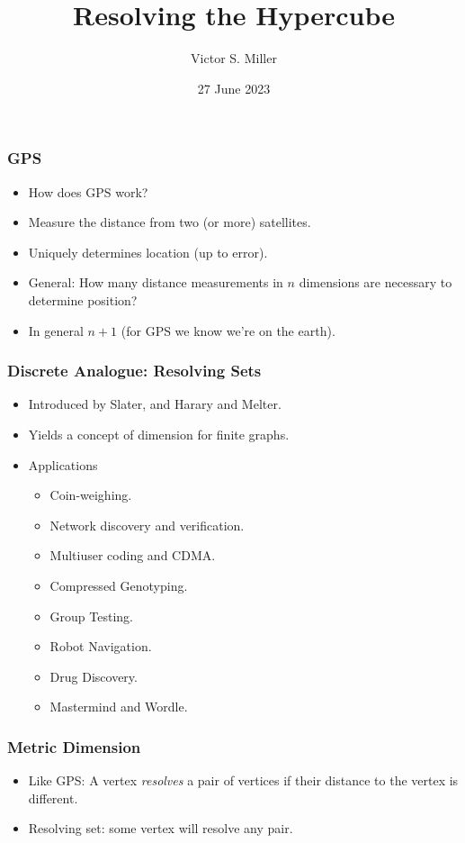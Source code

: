 \documentclass{beamer}
\title{Resolving the Hypercube}
\author{Victor S. Miller}
\institute{SRI International, Computer Science Laboratory \\
Menlo Park, CA USA}
\date{27 June 2023}
\begin{document}
\begin{frame}[plain]
  \maketitle
\end{frame}
\begin{frame}
  \frametitle{GPS}
  \begin{itemize}
  \item How does GPS work?
  \item Measure the distance from two (or more) satellites.
  \item Uniquely determines location (up to error).
  \item General: How many distance measurements in $n$ dimensions are
    necessary to determine position?
  \item In general $n+1$ (for GPS we know we're on the earth).
  \end{itemize}
\end{frame}
\begin{frame}
  \frametitle{Discrete Analogue: Resolving Sets}
  \begin{itemize}
  \item Introduced by Slater, and Harary and Melter.
  \item Yields a concept of dimension for finite graphs.
  \item Applications
    \begin{itemize}
    \item Coin-weighing.
    \item Network discovery and verification.
    \item Multiuser coding and CDMA.
    \item Compressed Genotyping.
    \item Group Testing.
    \item Robot Navigation.
    \item Drug Discovery.
    \item Mastermind and Wordle.
    \end{itemize}
  \end{itemize}
\end{frame}
\begin{frame}
  \frametitle{Metric Dimension}
  \begin{itemize}
  \item Like GPS: A vertex \emph{resolves} a pair of vertices if their
    distance to the vertex is different.
  \item Resolving set: some vertex will resolve any pair.
  \end{itemize}
\end{frame}
\end{document}
